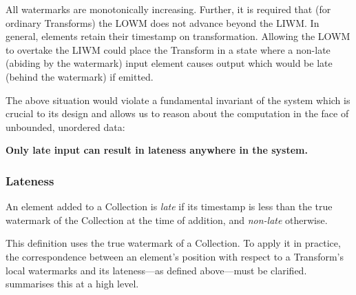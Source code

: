 All watermarks are monotonically increasing.
Further, it is required that (for ordinary Transforms) the LOWM does not advance beyond the LIWM.
In general, elements retain their timestamp on transformation.
Allowing the LOWM to overtake the LIWM could place the Transform in a state where a non-late (abiding by the watermark) input element causes output which would be late (behind the watermark) if emitted.

The above situation would violate a fundamental invariant of the system which is crucial to its design and allows us to reason about the computation in the face of unbounded, unordered data:

\textbf{Only late input can result in lateness anywhere in the system.}

\subsubsection{Lateness}

An element added to a Collection is \emph{late} if its timestamp is less than the true watermark of the Collection at the time of addition, and \emph{non-late} otherwise.

This definition uses the true watermark of a Collection.
To apply it in practice, the correspondence between an element's position with respect to a Transform's local watermarks and its lateness---as defined above---must be clarified.
 summarises this at a high level.

